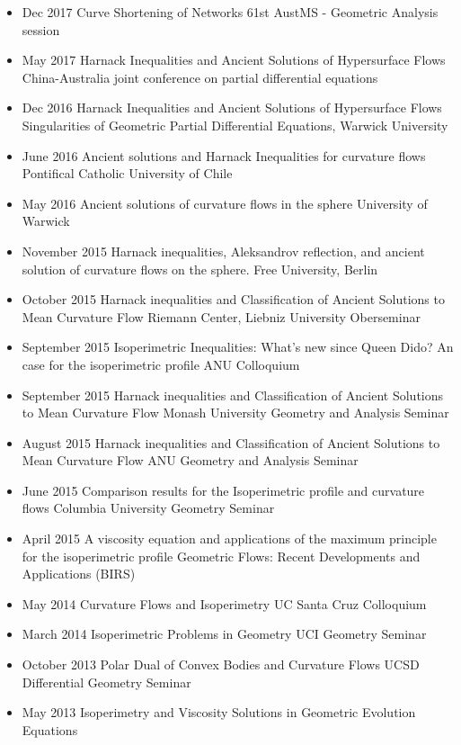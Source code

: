 \documentclass[12pt]{article}
\begin{document}
\begin{itemize}
\item Dec 2017 Curve Shortening of Networks
61st AustMS - Geometric Analysis session
\item May 2017 Harnack Inequalities and Ancient Solutions of Hypersurface Flows
China-Australia joint conference on partial differential equations
\item Dec 2016 Harnack Inequalities and Ancient Solutions of Hypersurface Flows
Singularities of Geometric Partial Differential Equations, Warwick University
\item June 2016 Ancient solutions and Harnack Inequalities for curvature flows
Pontifical Catholic University of Chile
\item May 2016 Ancient solutions of curvature flows in the sphere
University of Warwick
\item November 2015 Harnack inequalities, Aleksandrov reflection, and ancient solution of curvature flows on the sphere.
Free University, Berlin
\item October 2015 Harnack inequalities and Classification of Ancient Solutions to Mean Curvature Flow
Riemann Center, Liebniz University Oberseminar
\item September 2015 Isoperimetric Inequalities: What's new since Queen Dido? An case for the isoperimetric profile
ANU Colloquium
\item September 2015 Harnack inequalities and Classification of Ancient Solutions to Mean Curvature Flow
Monash University Geometry and Analysis Seminar
\item August 2015 Harnack inequalities and Classification of Ancient Solutions to Mean Curvature Flow
ANU Geometry and Analysis Seminar
\item June 2015 Comparison results for the Isoperimetric profile and curvature flows
Columbia University Geometry Seminar
\item April 2015 A viscosity equation and applications of the maximum principle for the isoperimetric profile
Geometric Flows: Recent Developments and Applications (BIRS)
\item May 2014 Curvature Flows and Isoperimetry
UC Santa Cruz Colloquium
\item March 2014 Isoperimetric Problems in Geometry
UCI Geometry Seminar
\item October 2013 Polar Dual of Convex Bodies and Curvature Flows
UCSD Differential Geometry Seminar
\item May 2013 Isoperimetry and Viscosity Solutions in Geometric Evolution Equations

\end{itemize}
\end{document}
